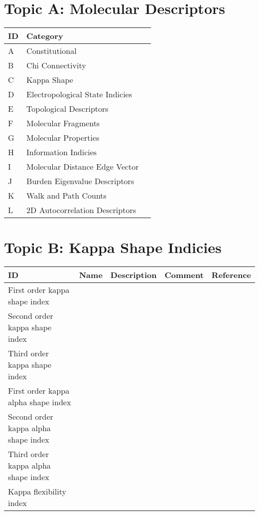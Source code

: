 
\section{Topic A: Molecular Descriptors}

\begin{table}[H]\centering
\footnotesize
\begin{tabular}{p{1cm}p{1cm}p{1cm}}
ID & Category & \\
	\hline
A & Constitutional & & \\
B & Chi Connectivity & & \\
C & Kappa Shape & & \\
D & Electropological State Indicies & & \\
E & Topological Descriptors & & \\
F & Molecular Fragments & & \\
G & Molecular Properties & & \\
H & Information Indicies & & \\
I & Molecular Distance Edge Vector &  & \\
J & Burden Eigenvalue Descriptors & & \\
K & Walk and Path Counts & & \\
L & 2D Autocorrelation Descriptors & & \\
\hline 
\hline
\end{tabular}
\end{table}

\section{Topic B: Kappa Shape Indicies}

\begin{table}[H]\centering
\begin{tabular}{p{1cm}p{2cm}p{3cm}p{3cm}p{1cm}}
ID & Name & Description & Comment & Reference \\
\hline
First order kappa shape index & & & & \\
Second order kappa shape index & & & & \\
Third order kappa shape index & & & & \\
First order kappa alpha shape index & & & & \\
Second order kappa alpha shape index & & & & \\
Third order kappa alpha shape index & & & & \\
Kappa flexibility index & & & & \\ 
\hline
\end{tabular}
\end{table}

